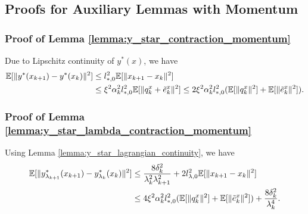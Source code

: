 \subsection{Proofs for Auxiliary Lemmas with Momentum}

\subsubsection{Proof of Lemma \ref{lemma:y_star_contraction_momentum}}
Due to Lipschitz continuity of $y^*(x)$, we have
\begin{align*}
    \mathbb{E}[\|y^*(x_{k+1}) - y^*(x_k)\|^2] &\le l_{*,0}^2 \mathbb{E}[\|x_{k+1} - x_k\|^2] \\
    &\le \xi^2 \alpha_k^2 l_{*,0}^2 \mathbb{E}[\|q_k^x + \tilde{e}_k^x\|^2] \le 2\xi^2 \alpha_k^2 l_{*,0}^2 (\mathbb{E}[\|q_k^x\|^2] + \mathbb{E}[\|\tilde{e}_k^x\|^2]).
\end{align*}

\subsubsection{Proof of Lemma \ref{lemma:y_star_lambda_contraction_momentum}}
Using Lemma \ref{lemma:y_star_lagrangian_continuity}, we have
\begin{align*}
    \mathbb{E}[\|y_{\lambda_{k+1}}^*(x_{k+1}) - y_{\lambda_{k}}^*(x_k)\|^2] &\le \frac{8\delta_k^2}{\lambda_k^2\lambda_{k+1}^2} + 2 l_{\lambda,0}^2 \mathbb{E}[\|x_{k+1} - x_k\|^2] \\
    &\le 4 \xi^2 \alpha_k^2 l_{*,0}^2 (\mathbb{E}[\|q_k^x\|^2] + \mathbb{E}[\|\tilde{e}_k^x\|^2]) + \frac{8\delta_k^2}{\lambda_k^4}.
\end{align*}


